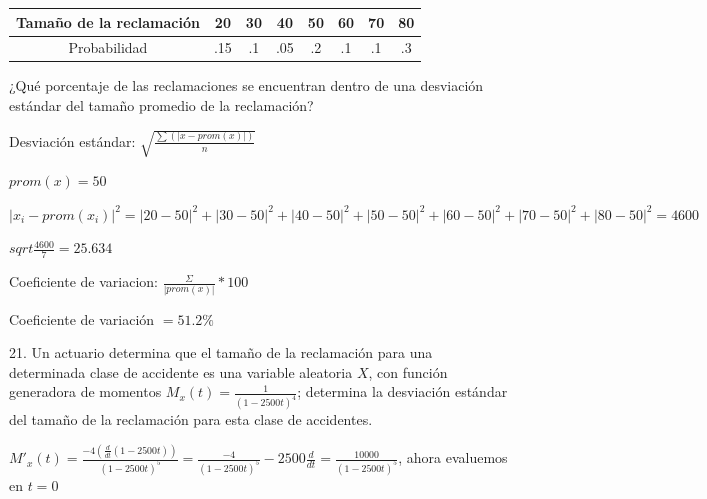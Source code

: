 \documentclass{article}
\begin{document}
        \begin{center}
            \begin{tabular}{| c | c | c | c | c | c | c | c |}
                \hline
                Tamaño de la reclamación & 20 & 30 & 40 & 50 & 60 & 70 & 80\\ \hline
                Probabilidad & .15 & .1 & .05 & .2 & .1 & .1 & .3\\ \hline
            \end{tabular} \vspace{.1cm}    
        \end{center}

        ¿Qué porcentaje de las reclamaciones se encuentran dentro 
        de una desviación estándar del tamaño promedio de la 
        reclamación?\vspace{.1cm}

        \vspace{.1cm}

        Desviación estándar: $\sqrt{\frac{\displaystyle\sum(|x-prom(x)|)}{n}}$\vspace{.1cm}

        $prom(x) = 50$\vspace{.1cm}

        $|x_{i}-prom(x_{i})|^2 = |20-50|^2 + |30-50|^2 + |40-50|^2 
        + |50-50|^2 + |60-50|^2 + |70-50|^2 + |80-50|^2 = 4600$\vspace{.1cm}

        $sqrt{\frac{4600}{7}} = 25.634$\vspace{.1cm}

        Coeficiente de variacion: $\frac{\Sigma}{|prom(x)|}*100$\vspace{.1cm}

        Coeficiente de variación $= 51.2\%$

        21. Un actuario determina que el tamaño de la reclamación 
        para una determinada clase de accidente es una variable 
        aleatoria $X$, con función generadora de momentos 
        $M_x(t)=\frac{1}{(1-2500t)^4}$; determina la desviación 
        estándar del tamaño de la reclamación para esta clase de 
        accidentes.\vspace{.1cm}

        \vspace{.1cm}

        $M'_x(t)=\frac{-4(\frac{d}{dt}(1-2500t))}{(1-2500t)^5} 
        = \frac{-4}{(1-2500t)^5}-2500\frac{d}{dt} = \frac{10000}{(1-2500t)^5}$, 
        ahora evaluemos en $t=0$ \vspace{.1cm}
\end{document}
